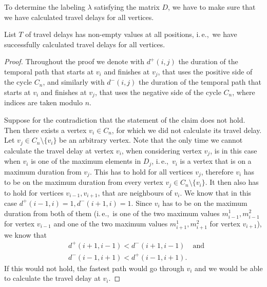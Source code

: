 \documentclass[a4paper,UKenglish,cleveref, autoref, thm-restate]{lipics-v2021}
\newcommand{\ie}{i.\,e.,\ }
\begin{document}
To determine the labeling $\lambda$ satisfying the matrix $D$, we have to make sure that we have calculated travel delays for all vertices.

\begin{lemma}
List $T$ of travel delays has non-empty values at all positions, \ie we have successfully calculated travel delays for all vertices.
\end{lemma}
\begin{proof}
    Throughout the proof we
    denote with $d^+(i,j)$ the duration of the temporal path that starts at $v_i$ and finishes at $v_j$, that uses the positive side of the cycle $C_n$,
    and similarly with $d^-(i,j)$ the duration of the temporal path that starts at $v_i$ and finishes at $v_j$, that uses the negative side of the cycle $C_n$,
    where indices are taken modulo $n$.
    
    Suppose for the contradiction that the statement of the claim does not hold. Then there exists a vertex $v_i \in C_n$, for which we did not calculate its travel delay.
    Let $v_j \in C_n \setminus \{v_i\}$ be an arbitrary vertex. 
    Note that the only time we cannot calculate the travel delay at vertex $v_i$, when considering vertex $v_j$, is in this case when $v_i$ is one of the maximum elements in $D_j$, \ie $v_i$ is a vertex that is on a maximum duration from $v_j$.
    This has to hold for all vertices $v_j$, therefore $v_i$ has to be on the maximum duration from every vertex $v_j \in C_n \setminus \{v_i\}$.
    It then also has to hold for vertices $v_{i-1}, v_{i+1}$, that are neighbours of $v_i$.
    We know that in this case $d^+(i-1,i) = 1, d^-(i+1,i) = 1$.
    Since $v_i$ has to be on the maximum duration from both of them 
    (\ie is one of the two maximum values $m^1_{i-1}, m^2_{i-1}$ for vertex $v_{i-1}$ and one of the two maximum values $m^1_{i+1}, m^2_{i+1}$ for vertex $v_{i+1}$),
    we know that 
    \begin{align}\label{eq:cycle-travel-delays-all}
        & d^+(i+1,i-1) < d^-(i+1,i-1) & \text{and}\\
        & d^-(i-1,i+1) < d^+(i-1,i+1).
    \end{align}
    If this would not hold, the fastest path would go through $v_i$ and we would be able to calculate the travel delay at $v_i$.
    

\end{proof}
\end{document}
